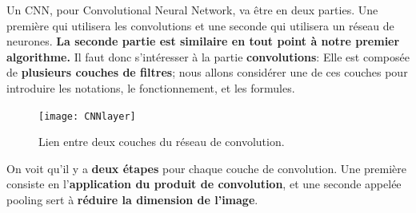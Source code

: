 \documentclass[12pt,a4paper]{extarticle}
\begin{document}
Un CNN, pour Convolutional Neural Network, va être en deux parties. Une première qui utilisera les convolutions et une seconde qui utilisera un réseau de neurones. \textbf{La seconde partie est similaire en tout point à notre premier algorithme.} Il faut donc s'intéresser à la partie \textbf{convolutions}:
Elle est composée de \textbf{plusieurs couches de filtres}; nous allons considérer une de ces couches pour introduire les notations, le fonctionnement, et les formules.
\begin{figure}[h]
\centering
\texttt{[image: CNNlayer]}
\caption{Lien entre deux couches du réseau de convolution.}
\end{figure}
On voit qu'il y a \textbf{deux étapes} pour chaque couche de convolution. Une première consiste en l'\textbf{application du produit de convolution}, et une seconde appelée pooling sert à \textbf{réduire la dimension de l'image}.
\end{document}
